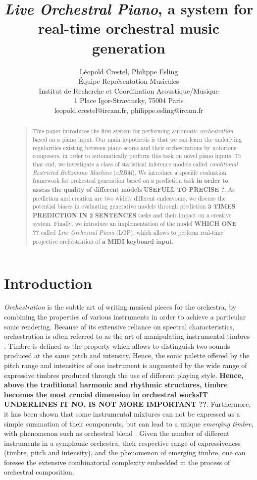 \documentclass[letterpaper]{article}
\title{\textit{Live Orchestral Piano}, a system for real-time orchestral music generation}
\author{L\'eopold Crestel, Philippe Esling\\
\'Equipe Repr\'esentation Musicales\\
Institut de Recherche et Coordination Acoustique/Musique\\
1 Place Igor-Stravinsky, 75004 Paris\\
leopold.crestel@ircam.fr, philippe.esling@ircam.fr\\
}
\begin{document}
 
\maketitle
\begin{abstract}
\begin{quote}
This paper introduces the first system for performing automatic \textit{orchestration} based on a piano input. Our main hypothesis is that we can learn the underlying regularities existing between piano scores and their orchestrations by notorious composers, in order to automatically perform this task on novel piano inputs. To that end, we investigate a class of statistical inference models called \textit{conditional Restricted Boltzmann Machine} (\textit{cRBM}). We introduce a specific evaluation framework for orchestral generation based on a prediction task \textbf{in order to assess the quality of different models} \textbf{USEFULL TO PRECISE ?}. As prediction and creation are two widely different endeavours, we discuss the potential biases in evaluating generative models through prediction \textbf{3 TIMES PREDICTION IN 2 SENTENCES} tasks and their impact on a creative system. Finally, we introduce an implementation of the model \textbf{WHICH ONE ??} called \textit{Live Orchestral Piano} (LOP), which allows to perform real-time projective orchestration of \textbf{a MIDI keyboard input}.
\end{quote}
\end{abstract}

\section{Introduction}
\textit{Orchestration} is the subtle art of writing musical pieces for the orchestra, by combining the properties of various instruments in order to achieve a particular sonic rendering. Because of its extensive reliance on spectral characteristics, orchestration is often referred to as the art of manipulating instrumental timbres \cite{mcadams2013timbre}. Timbre is defined as the property which allows to distinguish two sounds produced at the same pitch and intensity.
Hence, the sonic palette offered by the pitch range and intensities of one instrument is augmented by the wide range of expressive timbres produced through the use of different playing style.
\textbf{Hence, above the traditional harmonic and rhythmic structures, timbre becomes the most crucial dimension in orchestral works}\textbf{IT UNDERLINES IT NO, IS NOT MORE IMPORTANT ??}. Furthermore, it has been shown that some instrumental mixtures can not be expressed as a simple summation of their components, but can lead to a unique \textit{emerging timbre}, with phenomenon such as orchestral blend \cite{tardieu2012perception}.
Given the number of different instruments in a symphonic orchestra, their respective range of expressiveness (timbre, pitch and intensity), and the phenomenon of emerging timbre, one can foresee the extensive combinatorial complexity embedded in the process of orchestral composition.
\end{document}

